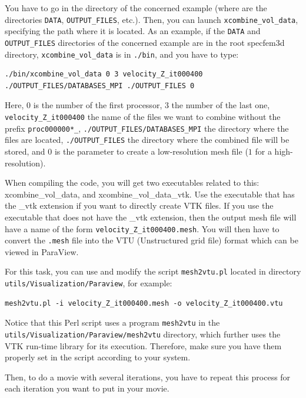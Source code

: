 You have to go in the directory of the concerned example (where are the directories \texttt{DATA}, \texttt{OUTPUT\_FILES}, etc.).
Then, you can launch \texttt{xcombine\_vol\_data}, specifying the path where it is located. As an example, if the \texttt{DATA} and \texttt{OUTPUT\_FILES} directories of the concerned example are in the root specfem3d directory, \texttt{xcombine\_vol\_data} is in \texttt{./bin}, and you have to type:

{\footnotesize
\begin{verbatim}
./bin/xcombine_vol_data 0 3 velocity_Z_it000400 ./OUTPUT_FILES/DATABASES_MPI ./OUTPUT_FILES 0
\end{verbatim}
}
Here, $0$ is the number of the first processor, $3$ the number of the last one, \texttt{velocity\_Z\_it000400} the name of the files we want to combine without the prefix \texttt{proc000000*\_}, \texttt{./OUTPUT\_FILES/DATABASES\_MPI} the directory where the files are located, \texttt{./OUTPUT\_FILES} the directory where the combined file will be stored, and $0$ is the parameter to create a low-resolution mesh file ($1$ for a high-resolution).

When compiling the code, you will get two executables related to this: xcombine\_vol\_data, and xcombine\_vol\_data\_vtk.
Use the executable that has the \_vtk extension if you want to directly create VTK files.
If you use the executable that does not have the \_vtk extension, then the output mesh file will have a name of the form \texttt{velocity\_Z\_it000400.mesh}.
You will then have to convert the \texttt{.mesh} file into the VTU (Unstructured grid file) format which can be viewed in ParaView.

\noindent
For this task, you can use and modify the
script \texttt{mesh2vtu.pl} located in directory \texttt{\small utils/Visualization/Paraview}, for example:

{\footnotesize
\begin{verbatim}
mesh2vtu.pl -i velocity_Z_it000400.mesh -o velocity_Z_it000400.vtu
\end{verbatim}
}

Notice that this Perl script uses a program \texttt{mesh2vtu} in the \texttt{utils/Visualization/Paraview/mesh2vtu} directory, which further
uses the VTK  run-time library for its execution. Therefore, make sure you have them properly set
in the script according to your system.

\bigskip

Then, to do a movie with several iterations, you have to repeat this process for each iteration you want to put in your movie.

